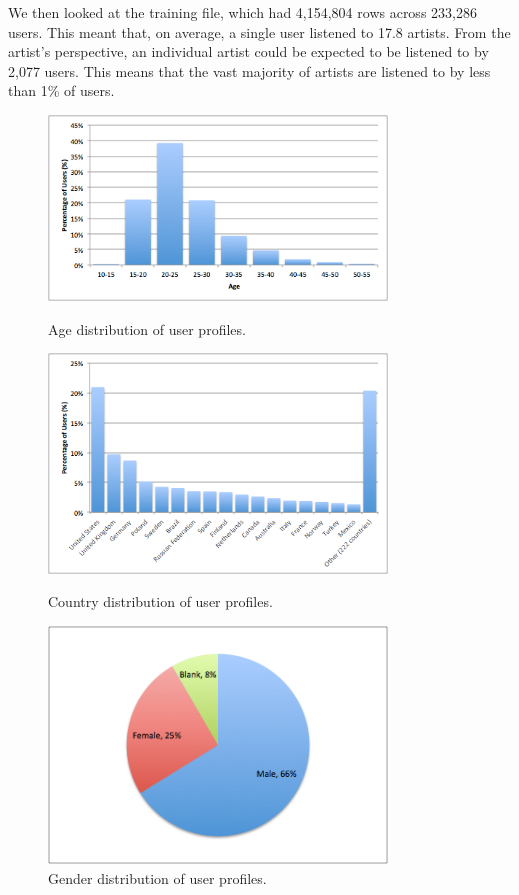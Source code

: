 \documentclass[11pt]{article}
\begin{document}
We then looked at the training file, which had 4,154,804 rows across 233,286 users. This meant that, on average, a single user  listened to 17.8 artists. From the artist's perspective, an individual artist could be expected to be listened to by 2,077 users. This means that the vast majority of artists are listened to by less than 1\% of users.\\

\begin{figure}[t]
    \centering
    \includegraphics[width=9cm]{figures/age_breakdown}
    \caption{Age distribution of user profiles.}
    \label{fig:age_breakdown}
    \vspace{2em}
    \includegraphics[width=9cm]{figures/country_breakdown}
    \caption{Country distribution of user profiles.}
    \label{fig:country_breakdown}
    \vspace{2em}
    \includegraphics[width=9cm]{figures/gender_breakdown}
    \caption{Gender distribution of user profiles.}
    \label{fig:gender_breakdown}
\end{figure}
\end{document}
